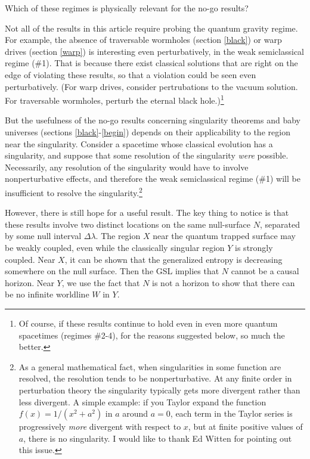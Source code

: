 \documentclass{article}
\begin{document}
\noindent Which of these regimes is physically relevant for the no-go results?

Not all of the results in this article require probing the quantum gravity regime.  For example, the absence of traversable wormholes (section \ref{black}) or warp drives (section \ref{warp}) is interesting even perturbatively, in the weak semiclassical regime (\#1).  That is because there exist classical solutions that are right on the edge of violating these results, so that a violation could be seen even perturbatively.  (For warp drives, consider pertrubations to the vacuum solution.  For traversable wormholes, perturb the eternal black hole.)\footnote{Of course, if these results continue to hold even in even more quantum spacetimes (regimes \#2-4), for the reasons suggested below, so much the better.}

But the usefulness of the no-go results concerning singularity theorems and baby universes (sections \ref{black}-\ref{begin}) depends on their applicability to the region near the singularity.  Consider a spacetime whose classical evolution has a singularity, and suppose that some resolution of the singularity \emph{were} possible.  Necessarily, any resolution of the singularity would have to involve nonperturbative effects, and therefore the weak semiclassical regime (\#1) will be insufficient to resolve the singularity.\footnote{As a general mathematical fact, when singularities in some function are resolved, the resolution tends to be nonperturbative.  At any finite order in perturbation theory the singularity typically gets more divergent rather than less divergent.  A simple example: if you Taylor expand the function $f(x) = 1/(x^2 + a^2)$ in $a$ around $a = 0$, each term in the Taylor series is progressively \emph{more} divergent with respect to $x$, but at finite positive values of $a$, there is no singularity.  I would like to thank Ed Witten for pointing out this issue.}

However, there is still hope for a useful result. The key thing to notice is that these results involve two distinct locations on the same null-surface $N$, separated by some null interval $\Delta \lambda$.  The region $X$ near the quantum trapped surface may be weakly coupled, even while the classically singular region $Y$  is strongly coupled.  Near $X$, it can be shown that the generalized entropy is decreasing somewhere on the null surface.  Then the GSL implies that $N$ cannot be a causal horizon.  Near $Y$, we use the fact that $N$ is not a horizon to show that there can be no infinite worldline $W$ in $Y$.
\end{document}
